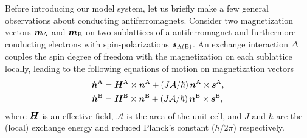 Before introducing our model system, let us briefly make a few general observations about conducting antiferromagnets. Consider two magnetization vectors $\boldsymbol{m}_\text{A}$ and $\boldsymbol{m}_\text{B}$ on two sublattices of a antiferromagnet and furthermore conducting electrons with spin-polarizations $\boldsymbol{s}_\text{A(B)}$. An exchange interaction $\Delta$ couples the spin degree of freedom with the magnetization on each sublattice locally, leading to the following equations of motion on magnetization vectors
\beml
\label{basicEQ}
\begin{align}
\dot{\boldsymbol{n}}^\textrm{A} &= \boldsymbol{H}^\textrm{A}\times\boldsymbol{n}^\textrm{A}  + (J\mathcal{A}/\hbar)\,\boldsymbol{n}^\textrm{A}\times \boldsymbol{s}^\textrm{A},\\
\dot{\boldsymbol{n}}^\textrm{B}&= \boldsymbol{H}^\textrm{B}\times\boldsymbol{n}^\textrm{B} +(J\mathcal{A}/\hbar)\,\boldsymbol{n}^\textrm{B}\times \boldsymbol{s}^\textrm{B},
\end{align}
\eml
where $\boldsymbol{H}$ is an effective field, $\mathcal{A}$ is the area of the unit cell, and $J$ and $\hbar$ are the (local) exchange energy and reduced Planck's constant ($h/2\pi$) respectively. 

